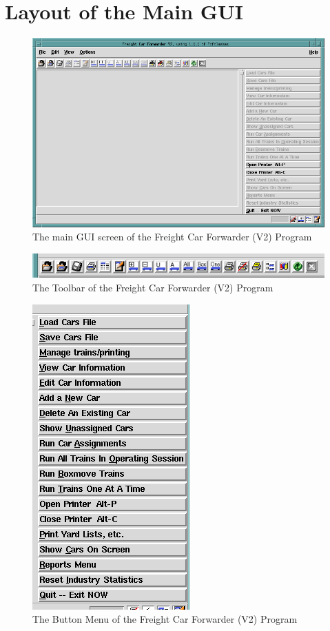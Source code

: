 \section{Layout of the Main GUI}

\begin{figure}[hbpt]
\begin{centering}
\includegraphics[width=5in]{FCFMain.png}
\caption{The main GUI screen of the Freight Car Forwarder (V2) Program}
\label{fig:fcf:FCFMain}
\end{centering}
\end{figure}
\begin{figure}[hbpt]
\begin{centering}
\includegraphics[width=5in]{FCFMainToolbar.png}
\caption{The Toolbar of the Freight Car Forwarder (V2) Program}
\label{fig:fcf:FCFMainToolbar}
\end{centering}
\end{figure}
\begin{figure}[hbpt]
\begin{centering}
\includegraphics{FCFMainButtonMenu.png}
\caption{The Button Menu of the Freight Car Forwarder (V2) Program}
\label{fig:fcf:FCFMainButtonMenu}
\end{centering}
\end{figure}
